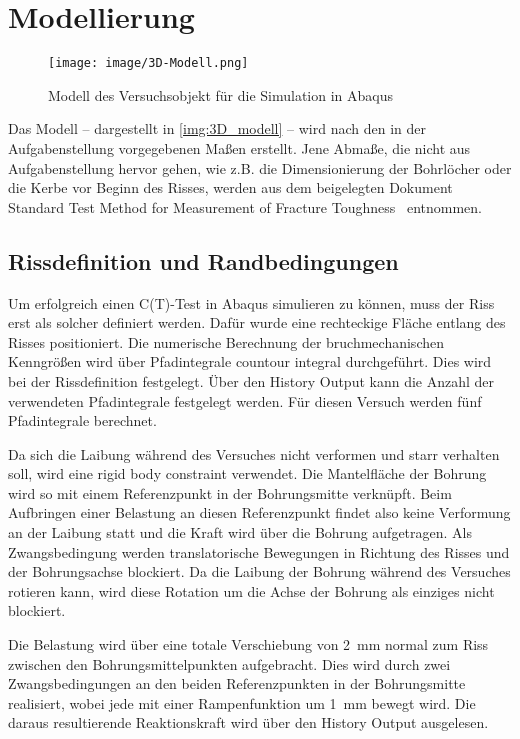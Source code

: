 \chapter{Modellierung}

\begin{figure}[h]
    \centering
    \texttt{[image: image/3D-Modell.png]}
    \caption{Modell des Versuchsobjekt für die Simulation in Abaqus}
    \label{img:3D_modell}
\end{figure}

Das Modell -- dargestellt in \autoref{img:3D_modell} -- wird nach den in der Aufgabenstellung vorgegebenen Maßen erstellt. Jene Abmaße, die nicht aus Aufgabenstellung hervor gehen, wie z.B. die Dimensionierung der Bohrlöcher oder die Kerbe vor Beginn des Risses, werden aus dem beigelegten Dokument \glqq Standard Test Method for Measurement of Fracture Toughness\grqq{}~\cite{astm} entnommen. 


\section{Rissdefinition und Randbedingungen} 

Um erfolgreich einen C(T)-Test in Abaqus simulieren zu können, muss der Riss erst als solcher definiert werden. Dafür wurde eine rechteckige Fläche entlang des Risses positioniert. Die numerische Berechnung der bruchmechanischen Kenngrößen wird über Pfadintegrale \glqq countour integral\grqq{} durchgeführt.  Dies wird bei der Rissdefinition festgelegt. Über den \glqq History Output\grqq{} kann die Anzahl der verwendeten Pfadintegrale festgelegt werden. Für diesen Versuch werden fünf Pfadintegrale berechnet.

Da sich die Laibung während des Versuches nicht verformen und starr verhalten soll, wird eine \glqq rigid body constraint\grqq{} verwendet. Die Mantelfläche der Bohrung wird so mit einem Referenzpunkt in der Bohrungsmitte verknüpft. Beim Aufbringen einer Belastung an diesen Referenzpunkt findet also keine Verformung an der Laibung statt und die Kraft wird über die Bohrung aufgetragen. Als Zwangsbedingung werden translatorische Bewegungen in Richtung des Risses und der Bohrungsachse blockiert. Da die Laibung der Bohrung während des Versuches rotieren kann, wird diese Rotation um die Achse der Bohrung als einziges nicht blockiert.

Die Belastung wird über eine totale Verschiebung von \SI{2}{\milli \meter} normal zum Riss zwischen den Bohrungsmittelpunkten aufgebracht. Dies wird durch zwei Zwangsbedingungen an den beiden Referenzpunkten in der Bohrungsmitte realisiert, wobei jede mit einer Rampenfunktion um \SI{1}{\mm} bewegt wird. Die daraus resultierende Reaktionskraft wird über den \glqq History Output\grqq{} ausgelesen.



